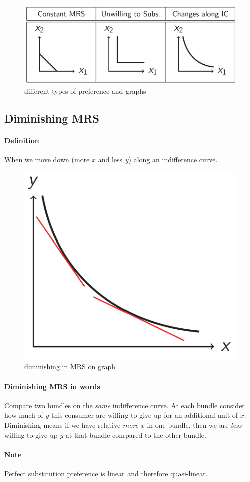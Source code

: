 \documentclass{article}
\begin{document}
			\begin{figure}[h]
				\centering
				\includegraphics[width=0.7\linewidth]{figure/lec3_2}
				\caption{different types of preference and graphs}
			\end{figure}
		
		\subsection{Diminishing MRS}
			\paragraph{Definition} When we move down (more $x$ and less $y$) along an indifference curve.
			\begin{figure}[h]
				\centering
				\includegraphics[width=0.5\linewidth]{figure/lec3_3}
				\caption{diminishing in MRS on graph}
			\end{figure}
			
			\paragraph{Diminishing MRS in words} Compare two bundles on the \emph{same} indifference curve. At each bundle consider how much of $y$ this consumer are willing to give up for an additional unit of $x$. Diminishing means if we have relative \emph{more} $x$ in one bundle, then we are \emph{less} willing to give up $y$ at that bundle compared to the other bundle.
			
			\paragraph{Note} Perfect substitution preference is linear and therefore quasi-linear.
			
\end{document}
